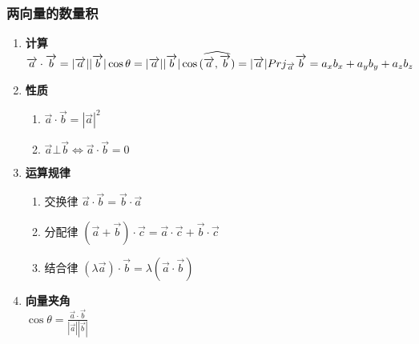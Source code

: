 \documentclass{article} %
\begin{document}
\subsubsection{两向量的数量积}
\begin{enumerate}
    \item \textbf{计算}\\
    $\overrightarrow{a}\cdot\overrightarrow{b}=|\overrightarrow{a}||\overrightarrow{b}|\cos\theta\\
    =|\overrightarrow{a}||\overrightarrow{b}|\cos\widehat{(\overrightarrow{a},\overrightarrow{b})}\\
    =|\overrightarrow{a}|Prj_{\overrightarrow{a}}\overrightarrow{b}\\
    =a_xb_x+a_yb_y+a_zb_z$

    \item \textbf{性质}\begin{enumerate}
        \item $\overrightarrow{a}\cdot\overrightarrow{b}=|\overrightarrow{a}|^2$
        \item $\overrightarrow{a}\bot \overrightarrow{b}\Leftrightarrow\overrightarrow{a}\cdot\overrightarrow{b}=0$
    \end{enumerate}

    \item \textbf{运算规律}\begin{enumerate}
        \item 交换律 $\overrightarrow{a}\cdot\overrightarrow{b}=\overrightarrow{b}\cdot\overrightarrow{a}$
        \item 分配律 $(\overrightarrow{a}+\overrightarrow{b})\cdot\overrightarrow{c}=\overrightarrow{a}\cdot\overrightarrow{c}+\overrightarrow{b}\cdot\overrightarrow{c}$
        \item 结合律 $(\lambda\overrightarrow{a})\cdot\overrightarrow{b}=\lambda(\overrightarrow{a}\cdot\overrightarrow{b})$
    \end{enumerate}
    \item \textbf{向量夹角}\\$\cos\theta=\frac{\overrightarrow{a}\cdot\overrightarrow{b}}{|\overrightarrow{a}||\overrightarrow{b}|}$
\end{enumerate}
\end{document}

